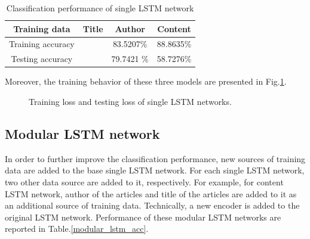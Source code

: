 \documentclass[12pt]{article}
\begin{document}
\begin{table}[!t]
\begin{center}
\caption{Classification performance of single LSTM network}
\label{single_lstm_acc}
\begin{tabular}{c|c|c|c}
\hline
Training data & Title & Author & Content\\
\hline

Training accuracy &  & 83.5207\% & 88.8635\% \\

Testing accuracy & & 79.7421 \% & 58.7276\% \\

\hline
\end{tabular}
\end{center}
\end{table}

Moreover, the training behavior of these three models are presented in Fig.\ref{training_loss_single}.


\begin{figure}[!t]
\begin{center}
\end{center}
\caption{Training loss and testing loss of single LSTM networks.}
\label{training_loss_single}
\end{figure}



\subsection{Modular LSTM network}

In order to further improve the classification performance, new sources of training data are added to the base single LSTM network. For each single LSTM network, two other data source are added to it, respectively. For example, for content LSTM network, author of the articles and title of the articles are added to it as an additional source of training data. Technically, a new encoder is added to the original LSTM network. Performance of these modular LSTM networks are reported in Table.\ref{modular_lstm_acc}.
\end{document}
